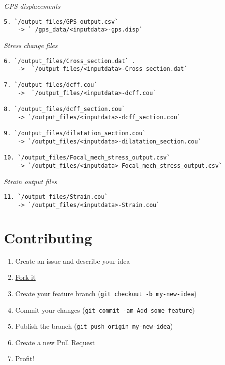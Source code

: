 \emph{GPS displacements}

\begin{verbatim}
5. `/output_files/GPS_output.csv` 
    -> ` /gps_data/<inputdata>-gps.disp`
\end{verbatim}

\emph{Stress change files}

\begin{verbatim}
6. `/output_files/Cross_section.dat` .
    ->  `/output_files/<inputdata>-Cross_section.dat`

7. `/output_files/dcff.cou` 
    ->  `/output_files/<inputdata>-dcff.cou`

8. `/output_files/dcff_section.cou` 
    -> `/output_files/<inputdata>-dcff_section.cou`

9. `/output_files/dilatation_section.cou` 
    -> `/output_files/<inputdata>-dilatation_section.cou`

10. `/output_files/Focal_mech_stress_output.csv` 
    -> `/output_files/<inputdata>-Focal_mech_stress_output.csv`
\end{verbatim}

\emph{Strain output files}

\begin{verbatim}
11. `/output_files/Strain.cou` 
    -> `/output_files/<inputdata>-Strain.cou`
\end{verbatim}

\section{Contributing}\label{contributing}

\begin{enumerate}
\def\labelenumi{\arabic{enumi}.}

\item
  Create an issue and describe your idea
\item
  \href{https://github.com/demanasta/coulomb2gmt/network\#fork-destination-box}{Fork
  it}
\item
  Create your feature branch (\texttt{git\ checkout\ -b\ my-new-idea})
\item
  Commit your changes
  (\texttt{git\ commit\ -am\  Add\ some\ feature})
\item
  Publish the branch (\texttt{git\ push\ origin\ my-new-idea})
\item
  Create a new Pull Request
\item
  Profit!
\end{enumerate}


